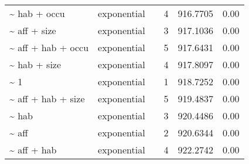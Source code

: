 \begin{table}[ht]
\begin{tabular}{llrrrr}
  \~{} hab + occu & exponential &  & 4 & 916.7705 & 0.00 \\ 
  \~{} aff + size & exponential &  & 3 & 917.1036 & 0.00 \\ 
  \~{} aff + hab + occu & exponential &  & 5 & 917.6431 & 0.00 \\ 
  \~{} hab + size & exponential &  & 4 & 917.8097 & 0.00 \\ 
  \~{} 1 & exponential &  & 1 & 918.7252 & 0.00 \\ 
  \~{} aff + hab + size & exponential &  & 5 & 919.4837 & 0.00 \\ 
  \~{} hab & exponential &  & 3 & 920.4486 & 0.00 \\ 
  \~{} aff & exponential &  & 2 & 920.6344 & 0.00 \\ 
  \~{} aff + hab & exponential &  & 4 & 922.2742 & 0.00 \\ 
  \end{tabular}
\label{tab:mod}
\end{table}
